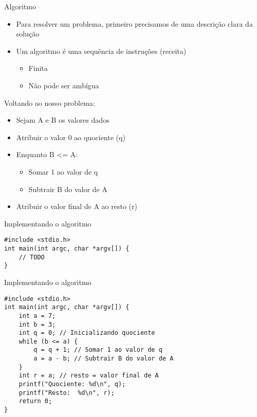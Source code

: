 \documentclass[t, aspectratio=169]{beamer}
\begin{document}
\begin{frame}[label={sec:org7c29e46}]{Algoritmo}
\begin{itemize}
\item Para resolver um problema, primeiro precisamos de uma descrição clara da solução
\item Um algoritmo é uma sequência de instruções (receita)
\begin{itemize}
\item Finita
\item Não pode ser ambígua
\end{itemize}
\end{itemize}

\alert{Voltando ao nosso problema:}

\begin{itemize}
\item Sejam A e B os valores dados
\item Atribuir o valor 0 ao quociente (q)
\item Enquanto \alert{B <= A}:
\begin{itemize}
\item Somar 1 ao valor de q
\item Subtrair B do valor de A
\end{itemize}
\item Atribuir o valor final de A ao resto (r)
\end{itemize}
\end{frame}

\begin{frame}[label={sec:orgde8c408},fragile]{Implementando o algoritmo}
 \vspace{-2em}
\begin{verbatim}
#include <stdio.h>
int main(int argc, char *argv[]) {
    // TODO
}
\end{verbatim}
\end{frame}

\begin{frame}[label={sec:orgd064266},fragile]{Implementando o algoritmo}
 \vspace{-2em}
\begin{verbatim}
#include <stdio.h>
int main(int argc, char *argv[]) {
    int a = 7;
    int b = 3;
    int q = 0; // Inicializando quociente
    while (b <= a) {
        q = q + 1; // Somar 1 ao valor de q
        a = a - b; // Subtrair B do valor de A
    }
    int r = a; // resto = valor final de A
    printf("Quociente: %d\n", q);
    printf("Resto:  %d\n", r);
    return 0;
}
\end{verbatim}
\end{frame}
\end{document}

